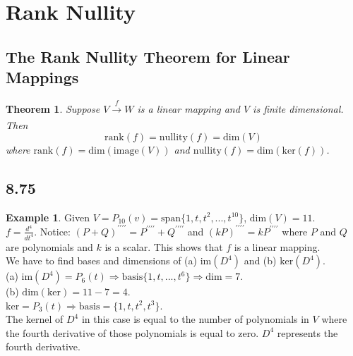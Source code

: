 \documentclass{report}
\theoremstyle{plain}
\newtheorem*{thrm}{Theorem}
\theoremstyle{definition}
\newtheorem*{ex}{Example}
\theoremstyle{plain}
\begin{document}
\section{Rank Nullity}
\subsection{The Rank Nullity Theorem for Linear Mappings}
\begin{thrm}
Suppose $V \xrightarrow[]{f} W$ is a linear mapping and $V$ is finite dimensional. Then
\[ \mathrm{rank}(f) = \mathrm{nullity}(f) = \mathrm{dim}(V) \]
where $\mathrm{rank}(f) = \mathrm{dim}(\mathrm{image}(V))$ and $\mathrm{nullity}(f)=\mathrm{dim}(\mathrm{ker}(f))$.
\end{thrm}
\subsection{8.75}
\begin{ex}
Given $V=P_{10}(v) = \mathrm{span}\{1,t,t^2,...,t^{10}\}$, $\mathrm{dim}(V)=11$.\\
$f=\frac{d^4}{dt^4}$. Notice: $(P+Q)^{\prime\prime\prime\prime} = P^{\prime\prime\prime\prime} + Q^{\prime\prime\prime\prime}$ and $(kP)^{\prime\prime\prime\prime} = kP^{\prime\prime\prime\prime}$ where $P$ and $Q$ are polynomials and $k$ is a scalar. This shows that $f$ is a linear mapping.\\
We have to find bases and dimensions of (a) $\mathrm{im}(D^4)$ and (b) $\mathrm{ker}(D^4)$.\\
(a) $\mathrm{im}(D^4)=P_6(t) \Rightarrow \mathrm{basis}\{1,t,...,t^6\} \Rightarrow \mathrm{dim} = 7$.\\
(b) $\mathrm{dim}(\mathrm{ker}) = 11-7=4$.\\
$\mathrm{ker} = P_3(t) \Rightarrow \mathrm{basis}=\{1,t,t^2,t^3\}$.\\
The kernel of $D^4$ in this case is equal to the number of polynomials in $V$ where the fourth derivative of those polynomials is equal to zero. $D^4$ represents the fourth derivative.
\end{ex}
\end{document}
